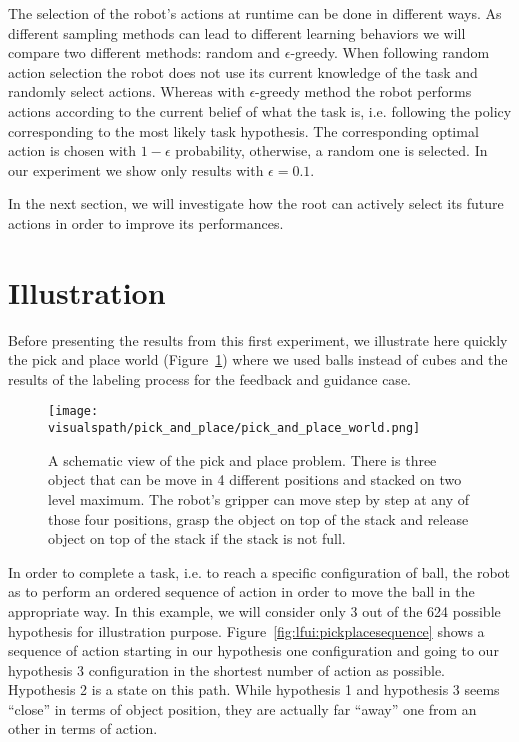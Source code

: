 The selection of the robot's actions at runtime can be done in different ways. As different sampling methods can lead to different learning behaviors we will compare two different methods: random and  $\epsilon$-greedy. When following random action selection the robot does not use its current knowledge of the task and randomly select actions. Whereas with $\epsilon$-greedy method the robot performs actions according to the current belief of what the task is, i.e. following the policy corresponding to the most likely task hypothesis. The corresponding optimal action is chosen with $1-\epsilon$ probability, otherwise, a random one is selected. In our experiment we show only results with $\epsilon =  0.1$.

In the next section, we will investigate how the root can actively select its future actions in order to improve its performances.

\section{Illustration}

Before presenting the results from this first experiment, we illustrate here quickly the pick and place world (Figure~\ref{fig:lfui:pickplaceworld}) where we used balls instead of cubes and the results of the labeling process for the feedback and guidance case.


\begin{figure}[!ht]
  \centering
  \texttt{[image: \\visualspath/pick\_and\_place/pick\_and\_place\_world.png]}
  \caption{A schematic view of the pick and place problem. There is three object that can be move in 4 different positions and stacked on two level maximum. The robot's gripper can move step by step at any of those four positions, grasp the object on top of the stack and release object on top of the stack if the stack is not full.}
  \label{fig:lfui:pickplaceworld}
\end{figure}

In order to complete a task, i.e. to reach a specific configuration of ball, the robot as to perform an ordered sequence of action in order to move the ball in the appropriate way. In this example, we will consider only 3 out of the 624 possible hypothesis for illustration purpose. Figure~\ref{fig:lfui:pickplacesequence} shows a sequence of action starting in our hypothesis one configuration and going to our hypothesis 3 configuration in the shortest number of action as possible. Hypothesis 2 is a state on this path. While hypothesis 1 and hypothesis 3 seems ``close'' in terms of object position, they are actually far ``away'' one from an other in terms of action.

